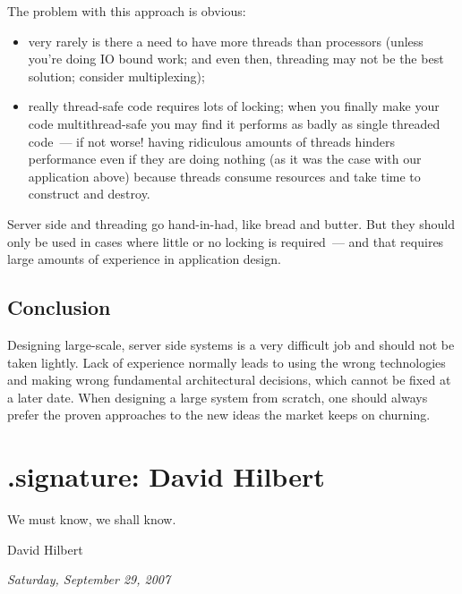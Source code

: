 \documentclass{book}
\begin{document}
The problem with this approach is obvious:

\begin{itemize}
\item very rarely is there a need to have more threads than processors
  (unless you're doing IO bound work; and even then, threading may not
  be the best solution; consider multiplexing);
\item really thread-safe code requires lots of locking; when you
  finally make your code multithread-safe you may find it performs as
  badly as single threaded code~--- if not worse!  having ridiculous
  amounts of threads hinders performance even if they are doing
  nothing (as it was the case with our application above) because
  threads consume resources and take time to construct and destroy.
\end{itemize}

Server side and threading go hand-in-had, like bread and butter. But
they should only be used in cases where little or no locking is
required~--- and that requires large amounts of experience in
application design.

\section{Conclusion}

Designing large-scale, server side systems is a very difficult job and
should not be taken lightly. Lack of experience normally leads to
using the wrong technologies and making wrong fundamental
architectural decisions, which cannot be fixed at a later date. When
designing a large system from scratch, one should always prefer the
proven approaches to the new ideas the market keeps on churning.

\chapter{.signature: David Hilbert}

\epigraph{We must know, we shall know.}{David Hilbert}

\begin{flushright}
  \emph{Saturday, September 29, 2007}
\end{flushright}
\end{document}
